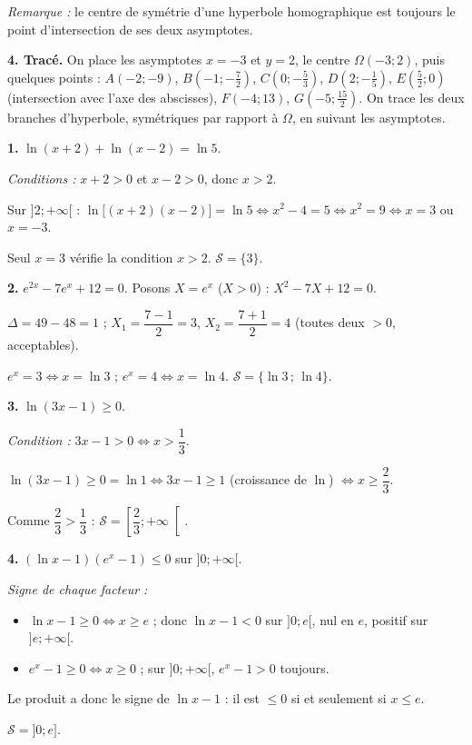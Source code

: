 \documentclass[11pt]{article}
\begin{document}
\begin{corrige}
\emph{Remarque :} le centre de symétrie d'une hyperbole homographique est toujours le point d'intersection de ses deux asymptotes.

\textbf{4. Tracé.} On place les asymptotes $x=-3$ et $y=2$, le centre $\Omega(-3;2)$, puis quelques points : $A(-2;-9)$, $B(-1;-\tfrac{7}{2})$, $C(0;-\tfrac{5}{3})$, $D(2;-\tfrac{1}{5})$, $E(\tfrac{5}{2};0)$ (intersection avec l'axe des abscisses), $F(-4;13)$, $G(-5;\tfrac{15}{2})$. On trace les deux branches d'hyperbole, symétriques par rapport à $\Omega$, en suivant les asymptotes.
\end{corrige}

\begin{corrige}
\textbf{1.} $\ln(x+2)+\ln(x-2)=\ln 5$.

\emph{Conditions :} $x+2>0$ et $x-2>0$, donc $x>2$.

Sur $]2;+\infty[$ : $\ln\big[(x+2)(x-2)\big]=\ln 5 \iff x^2-4=5 \iff x^2=9 \iff x=3$ ou $x=-3$.

Seul $x=3$ vérifie la condition $x>2$. \quad $\mathcal{S}=\{3\}$.

\textbf{2.} $e^{2x}-7e^x+12=0$. Posons $X=e^x$ ($X>0$) : $X^2-7X+12=0$.

$\Delta = 49-48=1$ ; $X_1=\dfrac{7-1}{2}=3$, $X_2=\dfrac{7+1}{2}=4$ (toutes deux $>0$, acceptables).

$e^x=3 \iff x=\ln 3$ ; $e^x=4 \iff x=\ln 4$. \quad $\mathcal{S}=\{\ln 3\,;\,\ln 4\}$.

\textbf{3.} $\ln(3x-1)\ge 0$.

\emph{Condition :} $3x-1>0 \iff x>\dfrac{1}{3}$.

$\ln(3x-1)\ge 0 = \ln 1 \iff 3x-1\ge 1$ (croissance de $\ln$) $\iff x\ge \dfrac{2}{3}$.

Comme $\dfrac{2}{3}>\dfrac{1}{3}$ : \quad $\mathcal{S}=\left[\dfrac{2}{3};+\infty\right[$.

\textbf{4.} $(\ln x - 1)(e^x-1)\le 0$ sur $]0;+\infty[$.

\emph{Signe de chaque facteur :}
\begin{itemize}
    \item $\ln x - 1 \ge 0 \iff x\ge e$ ; donc $\ln x - 1 < 0$ sur $]0;e[$, nul en $e$, positif sur $]e;+\infty[$.
    \item $e^x - 1 \ge 0 \iff x\ge 0$ ; sur $]0;+\infty[$, $e^x-1>0$ toujours.
\end{itemize}
Le produit a donc le signe de $\ln x - 1$ : il est $\le 0$ si et seulement si $x\le e$.

$\mathcal{S}=]0;e]$.
\end{corrige}
\end{document}
